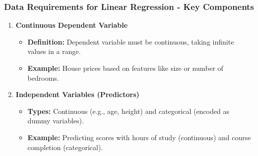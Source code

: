 \documentclass[aspectratio=169]{beamer}
\begin{document}
\begin{frame}[fragile]
    \frametitle{Data Requirements for Linear Regression - Key Components}
    \begin{enumerate}
        \item \textbf{Continuous Dependent Variable}
        \begin{itemize}
            \item \textbf{Definition:} Dependent variable must be continuous, taking infinite values in a range.
            \item \textbf{Example:} House prices based on features like size or number of bedrooms.
        \end{itemize}
        
        \item \textbf{Independent Variables (Predictors)}
        \begin{itemize}
            \item \textbf{Types:} Continuous (e.g., age, height) and categorical (encoded as dummy variables).
            \item \textbf{Example:} Predicting scores with hours of study (continuous) and course completion (categorical).
        \end{itemize}
    \end{enumerate}
\end{frame}
\end{document}
